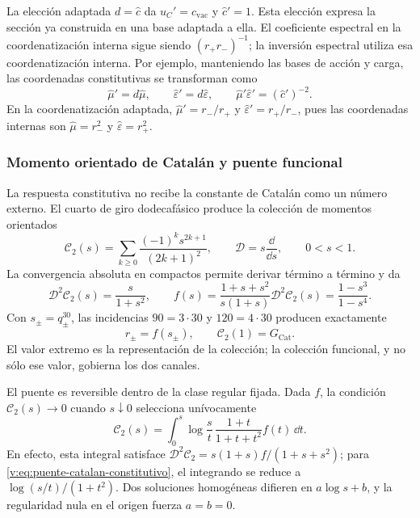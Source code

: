 La elección adaptada $d=\widehat c$ da $u_C'=c_{\mathrm{vac}}$ y
$\widehat c'=1$. Esta elección expresa la sección ya construida en una
base adaptada a ella. El coeficiente espectral en la coordenatización interna sigue
siendo $(r_+r_-)^{-1}$; la inversión espectral utiliza esa coordenatización interna.
Por ejemplo, manteniendo las bases de acción y carga, las coordenadas
constitutivas se transforman como
\[
 \widehat\mu'=d\widehat\mu,
 \qquad \widehat\varepsilon'=d\widehat\varepsilon,
 \qquad
 \widehat\mu'\widehat\varepsilon'=(\widehat c')^{-2}.
\]
En la coordenatización adaptada, $\widehat\mu'=r_-/r_+$ y
$\widehat\varepsilon'=r_+/r_-$, pues las coordenadas internas son
$\widehat\mu=r_-^2$ y $\widehat\varepsilon=r_+^2$.

\subsubsection{Momento orientado de Catalán y puente funcional}

La respuesta constitutiva no recibe la constante de Catalán como un
número externo. El cuarto de giro dodecafásico produce la colección de
momentos orientados
\begin{equation}
 \mathcal C_2(s)=\sum_{k\geq0}
 \frac{(-1)^ks^{2k+1}}{(2k+1)^2},\qquad
 \mathcal D=s\frac{\dd}{\dd s},\qquad 0<s<1.
 \label{v:eq:momento-catalan}
\end{equation}
La convergencia absoluta en compactos permite derivar término a término y
da
\begin{equation}
 \mathcal D^2\mathcal C_2(s)=\frac{s}{1+s^2},\qquad
 f(s)=\frac{1+s+s^2}{s(1+s)}\mathcal D^2\mathcal C_2(s)
 =\frac{1-s^3}{1-s^4}.
 \label{v:eq:puente-catalan-constitutivo}
\end{equation}
Con $s_\pm=q_\pm^{30}$, las incidencias $90=3\cdot30$ y
$120=4\cdot30$ producen exactamente
\begin{equation}
 r_\pm=f(s_\pm),\qquad
 \mathcal C_2(1)=G_{\mathrm{Cat}}.
 \label{v:eq:catalan-canales}
\end{equation}
El valor extremo es la representación de la colección; la colección funcional,
y no sólo ese valor, gobierna los dos canales.

El puente es reversible dentro de la clase regular fijada. Dada $f$, la
condición $\mathcal C_2(s)\to0$ cuando $s\downarrow0$ selecciona
unívocamente
\begin{equation}
 \mathcal C_2(s)=\int_0^s\log\frac{s}{t}\,
 \frac{1+t}{1+t+t^2}f(t)\,\dd t.
 \label{v:eq:restitucion-funcional-catalan}
\end{equation}
En efecto, esta integral satisface
$\mathcal D^2\mathcal C_2=s(1+s)f/(1+s+s^2)$; para
\eqref{v:eq:puente-catalan-constitutivo}, el integrando se reduce a
$\log(s/t)/(1+t^2)$. Dos soluciones homogéneas difieren en
$a\log s+b$, y la regularidad nula en el origen fuerza $a=b=0$.

